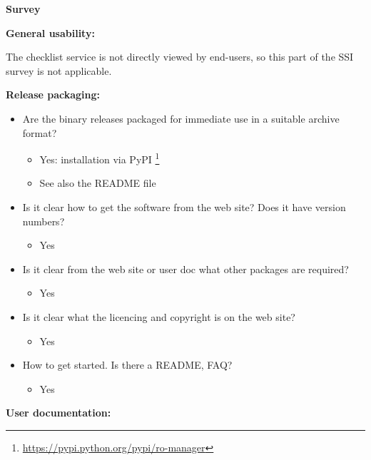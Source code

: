 \textbf{Survey}

\textbf{General usability:}

The checklist service is not directly viewed by end-users, so this part
of the SSI survey is not applicable.

\textbf{Release packaging:}

\begin{itemize}
\itemsep1pt\parskip0pt
\item
  Are the binary releases packaged for immediate use in a suitable
  archive format?

  \begin{itemize}
  \itemsep1pt\parskip0pt
  \item
    Yes: installation via PyPI \footnote{\url{https://pypi.python.org/pypi/ro-manager}}
  \item
    See also the README file
  \end{itemize}
\item
  Is it clear how to get the software from the web site? Does it have
  version numbers?

  \begin{itemize}
  \itemsep1pt\parskip0pt
  \item
    Yes
  \end{itemize}
\item
  Is it clear from the web site or user doc what other packages are
  required?

  \begin{itemize}
  \itemsep1pt\parskip0pt
  \item
    Yes
  \end{itemize}
\item
  Is it clear what the licencing and copyright is on the web site?

  \begin{itemize}
  \itemsep1pt\parskip0pt
  \item
    Yes
  \end{itemize}
\item
  How to get started. Is there a README, FAQ?

  \begin{itemize}
  \itemsep1pt\parskip0pt
  \item
    Yes
  \end{itemize}
\end{itemize}

\textbf{User documentation:}


